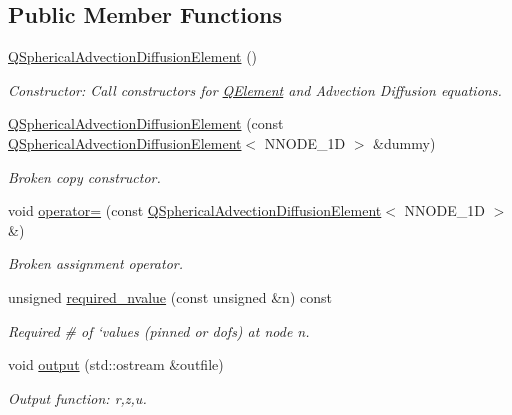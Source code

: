 \subsection*{Public Member Functions}
\begin{DoxyCompactItemize}
\item 
\hyperlink{classoomph_1_1QSphericalAdvectionDiffusionElement_a7a82f6fad31e48bcc3fe1e1d7b818a74}{Q\+Spherical\+Advection\+Diffusion\+Element} ()
\begin{DoxyCompactList}\small\item\em Constructor\+: Call constructors for \hyperlink{classoomph_1_1QElement}{Q\+Element} and Advection Diffusion equations. \end{DoxyCompactList}\item 
\hyperlink{classoomph_1_1QSphericalAdvectionDiffusionElement_a3ab4082df2e8a5d0c6dc95432487ba71}{Q\+Spherical\+Advection\+Diffusion\+Element} (const \hyperlink{classoomph_1_1QSphericalAdvectionDiffusionElement}{Q\+Spherical\+Advection\+Diffusion\+Element}$<$ N\+N\+O\+D\+E\+\_\+1D $>$ \&dummy)
\begin{DoxyCompactList}\small\item\em Broken copy constructor. \end{DoxyCompactList}\item 
void \hyperlink{classoomph_1_1QSphericalAdvectionDiffusionElement_ade39bb468f6f05959ae31698b40cde10}{operator=} (const \hyperlink{classoomph_1_1QSphericalAdvectionDiffusionElement}{Q\+Spherical\+Advection\+Diffusion\+Element}$<$ N\+N\+O\+D\+E\+\_\+1D $>$ \&)
\begin{DoxyCompactList}\small\item\em Broken assignment operator. \end{DoxyCompactList}\item 
unsigned \hyperlink{classoomph_1_1QSphericalAdvectionDiffusionElement_acd51b557de9302ded1dd48c72760d3df}{required\+\_\+nvalue} (const unsigned \&n) const
\begin{DoxyCompactList}\small\item\em Required \# of `values\textquotesingle{} (pinned or dofs) at node n. \end{DoxyCompactList}\item 
void \hyperlink{classoomph_1_1QSphericalAdvectionDiffusionElement_addf1f59cc684120c3063774ce75a72a4}{output} (std\+::ostream \&outfile)
\begin{DoxyCompactList}\small\item\em Output function\+: r,z,u. \end{DoxyCompactList}\item 

\end{DoxyCompactItemize}
